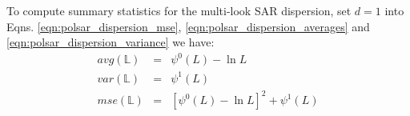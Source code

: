 \documentclass[journal,12pt,draftcls,onecolumn]{IEEEtran}
\begin{document}
%

To compute summary statistics for the multi-look SAR dispersion,
  set $d=1$ into Eqns. \ref{eqn:polsar_dispersion_mse}, \ref{eqn:polsar_dispersion_averages} and \ref{eqn:polsar_dispersion_variance}
we have:
  \begin{eqnarray*}
    avg(\mathbb{L}) &=& \psi^0(L) - \ln{L} \\
    var(\mathbb{L}) &=& \psi^1(L) \\
    mse(\mathbb{L}) &=& \left[ \psi^0(L) - \ln{L} \right]^2 + \psi^1(L)
\end{eqnarray*}
\end{document}

